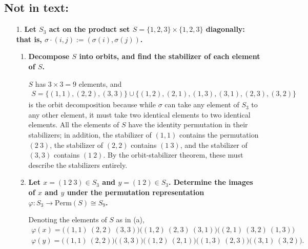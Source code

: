 \documentclass[a4paper,12pt]{article}
\begin{document}
\subsection*{Not in text:}
\begin{enumerate}
    \item[1.]
        \boldmath
        \textbf{Let $S_3$ act on the product set $S = \{ 1, 2, 3 \} \times \{ 1, 2, 3 \}$ diagonally: that is, $\sigma \cdot (i, j) := (\sigma(i), \sigma(j))$.} \par
        \unboldmath
        \begin{enumerate}
            \item
                \boldmath
                \textbf{Decompose $S$ into orbits, and find the stabilizer of each element of $S$.} \par
                \unboldmath
                $S$ has $3 \times 3 = 9$ elements, and
                \begin{align*}
                    S = \{ (1, 1), (2, 2), (3, 3) \} \cup \{ (1, 2), (2, 1), (1, 3), (3, 1), (2, 3), (3, 2) \}
                \end{align*}
                is the orbit decomposition because while $\sigma$ can take any element of $S_3$ to any other element, it must take two identical elements to two identical elements. All the elements of $S$ have the identity permutation in their stabilizers; in addition, the stabilizer of $(1, 1)$ contains the permutation $(2\ 3)$, the stabilizer of $(2, 2)$ contains $(1\ 3)$, and the stabilizer of $(3, 3)$ contains $(1\ 2)$. By the orbit-stabilizer theorem, these must describe the stabilizers entirely.

            \item
                \boldmath
                \textbf{Let $x = (1\ 2\ 3) \in S_3$ and $y = (1\ 2) \in S_3$. Determine the images of $x$ and $y$ under the permutation representation $\varphi : S_3 \to \text{Perm}(S) \cong S_9$.} \par
                \unboldmath
                Denoting the elements of $S$ as in (a),
                \begin{gather*}                
                    \varphi(x) = \bigl( (1, 1)\ (2, 2)\ (3, 3) \bigr) \bigl( (1, 2)\ (2, 3)\ (3, 1) \bigr) \bigl( (2, 1)\ (3, 2)\ (1, 3) \bigr) \\
                    \varphi(y) = \bigl( (1, 1)\ (2, 2) \bigr) \bigl( (3, 3) \bigr) \bigl( (1, 2)\ (2, 1) \bigr) \bigl( (1, 3)\ (2, 3) \bigr) \bigl( (3, 1)\ (3, 2) \bigr).
                \end{gather*}                
        \end{enumerate}


\end{enumerate}
\end{document}
